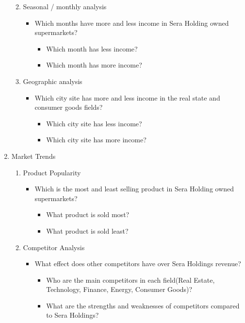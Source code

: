 \documentclass[12pt,a4Paper]{article}
\begin{document}
\begin{enumerate}
\begin{enumerate}
\begin{itemize}
		\end{itemize}
	\item Seasonal / monthly analysis
		\begin{itemize}
		\item Which months have more and less income in Sera Holding owned supermarkets?
			\begin{itemize}
			\item Which month has less income?
			\item Which month has more income?
			\end{itemize}
		\end{itemize}
	\item Geographic analysis
		\begin{itemize}
		\item Which city site has more and less income in the real state and consumer goods fields?
			\begin{itemize}
			\item Which city site has less income?
			\item Which city site has more income?
			\end{itemize}
		\end{itemize}
	\end{enumerate}
\item Market Trends
	\begin{enumerate}
	\item Product Popularity
		\begin{itemize}
		\item Which is the most and least selling product in Sera Holding owned supermarkets?
			\begin{itemize}
			\item What product is sold most?
			\item What product is sold least?
			\end{itemize}
		\end{itemize}
		\newpage
	\item Competitor Analysis
		\begin{itemize}
		\item What effect does other competitors have over Sera Holdings revenue?
			\begin{itemize}
			\item Who are the main competitors in each field(Real Estate, Technology, Finance, Energy, Consumer Goods)?
			\item What are the strengths and weaknesses of competitors compared to Sera Holdings?
			\end{itemize}

\end{itemize}
\end{enumerate}
\end{enumerate}
\end{document}
